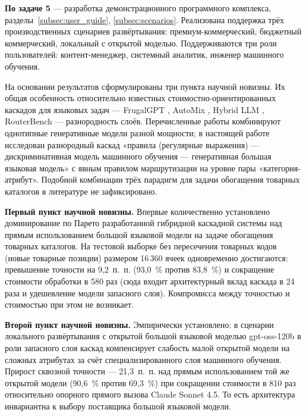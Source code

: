 \textbf{По задаче 5} — разработка демонстрационного программного комплекса, разделы~\ref{subsec:user_guide}, \ref{subsec:scenarios}. Реализована поддержка трёх производственных сценариев развёртывания: премиум-коммерческий, бюджетный коммерческий, локальный с открытой моделью. Поддерживаются три роли пользователей: контент-менеджер, системный аналитик, инженер машинного обучения.

На основании результатов сформулированы три пункта научной новизны. Их общая особенность относительно известных стоимостно-ориентированных каскадов для языковых задач — FrugalGPT \cite{ref_9}, AutoMix \cite{ref_10}, Hybrid LLM \cite{ref_11}, RouterBench \cite{ref_12} — разнородность слоёв. Перечисленные работы комбинируют однотипные генеративные модели разной мощности; в настоящей работе исследован разнородный каскад «правила (регулярные выражения) — дискриминативная модель машинного обучения — генеративная большая языковая модель» с явным правилом маршрутизации на уровне пары «категория-атрибут». Подобной комбинации трёх парадигм для задачи обогащения товарных каталогов в литературе не зафиксировано.

\textbf{Первый пункт научной новизны.} Впервые количественно установлено доминирование по Парето разработанной гибридной каскадной системы над прямым использованием большой языковой модели на задаче обогащения товарных каталогов. На тестовой выборке без пересечения товарных кодов (новые товарные позиции) размером 16\,360 ячеек одновременно достигаются: превышение точности на 9,2~п.~п. (93,0~\% против 83,8~\%) и сокращение стоимости обработки в 580 раз (сюда входит архитектурный вклад каскада в 24 раза и удешевление модели запасного слоя). Компромисса между точностью и стоимостью при этом не возникает.

\textbf{Второй пункт научной новизны.} Эмпирически установлено: в сценарии локального развёртывания с открытой большой языковой моделью gpt-oss-120b в роли запасного слоя каскад компенсирует слабость малой открытой модели на сложных атрибутах за счёт специализированного слоя машинного обучения. Прирост сквозной точности — 21,3~п.~п. над прямым использованием той же открытой модели (90,6~\% против 69,3~\%) при сокращении стоимости в 810 раз относительно опорного прямого вызова Claude Sonnet 4.5. То есть архитектура инвариантна к выбору поставщика большой языковой модели.

